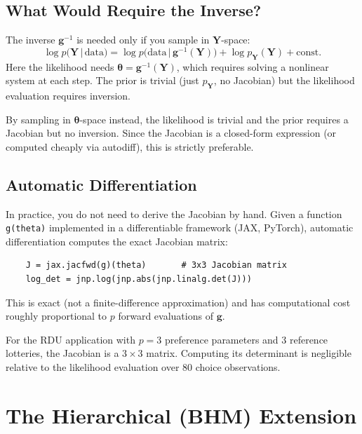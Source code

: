 \documentclass[11pt,a4paper]{article}
\theoremstyle{definition}
\newcommand{\given}{\,|\,}
\newcommand{\btheta}{\boldsymbol{\theta}}
\begin{document}
\subsection{What Would Require the Inverse?}

The inverse $\mathbf{g}^{-1}$ is needed only if you sample in
$\mathbf{Y}$-space:
\begin{equation}
    \log p(\mathbf{Y} \given \text{data}) =
    \log p\!\big(\text{data} \given \mathbf{g}^{-1}(\mathbf{Y})\big)
    + \log p_{\mathbf{Y}}(\mathbf{Y})
    + \text{const.}
\end{equation}
Here the likelihood needs $\btheta = \mathbf{g}^{-1}(\mathbf{Y})$, which
requires solving a nonlinear system at each step. The prior is trivial (just
$p_{\mathbf{Y}}$, no Jacobian) but the likelihood evaluation requires inversion.

By sampling in $\btheta$-space instead, the likelihood is trivial and the
prior requires a Jacobian but no inversion. Since the Jacobian is a closed-form
expression (or computed cheaply via autodiff), this is strictly preferable.

\subsection{Automatic Differentiation}

In practice, you do not need to derive the Jacobian by hand. Given a function
\texttt{g(theta)} implemented in a differentiable framework (JAX, PyTorch),
automatic differentiation computes the exact Jacobian matrix:
\begin{verbatim}
    J = jax.jacfwd(g)(theta)       # 3x3 Jacobian matrix
    log_det = jnp.log(jnp.abs(jnp.linalg.det(J)))
\end{verbatim}
This is exact (not a finite-difference approximation) and has computational
cost roughly proportional to $p$ forward evaluations of $\mathbf{g}$.

For the RDU application with $p = 3$ preference parameters and 3 reference
lotteries, the Jacobian is a $3 \times 3$ matrix. Computing its determinant is
negligible relative to the likelihood evaluation over 80 choice observations.


\section{The Hierarchical (BHM) Extension}
\label{sec:bhm}
\end{document}
